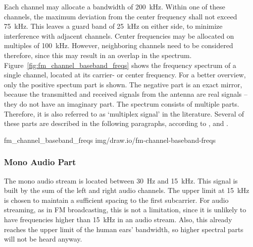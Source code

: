 Each channel may allocate a bandwidth of 200~kHz.
Within one of these channels, the maximum deviation from the center frequency shall not exceed 75~kHz.
This leaves a guard band of 25~kHz on either side, to minimize interference with adjacent channels.
Center frequencies may be allocated on multiples of 100~kHz.
However, neighboring channels need to be considered therefore, since this may result in an overlap in the spectrum.\\

Figure~\ref{fig:fm_channel_baseband_freqs} shows the frequency spectrum of a single channel, located at its carrier- or center frequency.
For a better overview, only the positive spectum part is shown.
The negative part is an exact mirror, because the transmitted and received signals from the antenna are real signals -- they do not have an imaginary part.
The spectrum consists of multiple parts.
Therefore, it is also referred to as `multiplex signal' in the literature.
Several of these parts are described in the following paragraphs, according to \cite{EbuFmRegulators},\cite{EtsiFmSoundBroadcastingServiceHarmonizedStandard} and \cite{ElectronicsNotesFmTutorial}.

 {fm_channel_baseband_freqs} {img/draw.io/fm-channel-baseband-freqs}

\subsubsection{Mono Audio Part}

The mono audio stream is located between 30~Hz and 15~kHz.
This signal is built by the sum of the left and right audio channels.
The upper limit at 15~kHz is chosen to maintain a sufficient spacing to the first subcarrier.
For audio streaming, as in FM broadcasting, this is not a limitation, since it is unlikely to have frequencies higher than 15~kHz in an audio stream.
Also, this already reaches the upper limit of the human ears' bandwidth, so higher spectral parts will not be heard anyway.


